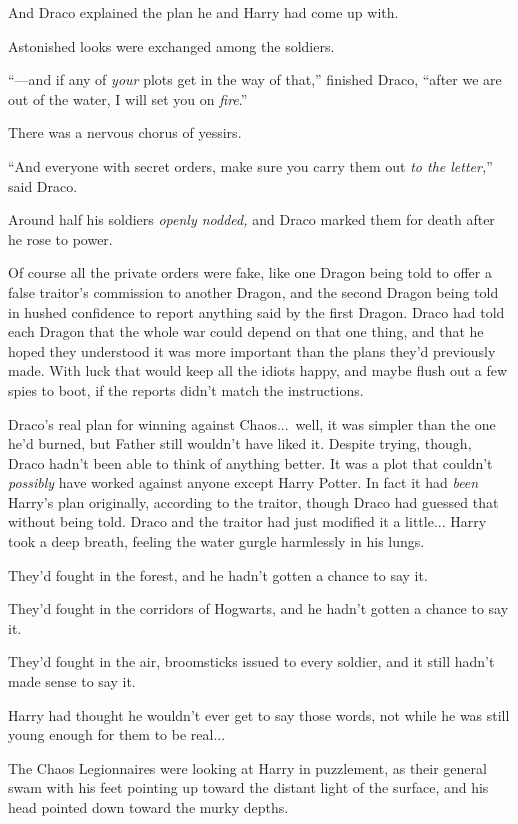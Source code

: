And Draco explained the plan he and Harry had come up with.

Astonished looks were exchanged among the soldiers.

“—and if any of \emph{your} plots get in the way of that,” finished Draco, “after we are out of the water, I will set you on \emph{fire}.”

There was a nervous chorus of yessirs.

“And everyone with secret orders, make sure you carry them out \emph{to the letter,}” said Draco.

Around half his soldiers \emph{openly nodded,} and Draco marked them for death after he rose to power.

Of course all the private orders were fake, like one Dragon being told to offer a false traitor’s commission to another Dragon, and the second Dragon being told in hushed confidence to report anything said by the first Dragon. Draco had told each Dragon that the whole war could depend on that one thing, and that he hoped they understood it was more important than the plans they’d previously made. With luck that would keep all the idiots happy, and maybe flush out a few spies to boot, if the reports didn’t match the instructions.

Draco’s real plan for winning against Chaos...\ well, it was simpler than the one he’d burned, but Father still wouldn’t have liked it. Despite trying, though, Draco hadn’t been able to think of anything better. It was a plot that couldn’t \emph{possibly} have worked against anyone except Harry Potter. In fact it had \emph{been} Harry’s plan originally, according to the traitor, though Draco had guessed that without being told. Draco and the traitor had just modified it a little...
\sbreak
Harry took a deep breath, feeling the water gurgle harmlessly in his lungs.

They’d fought in the forest, and he hadn’t gotten a chance to say it.

They’d fought in the corridors of Hogwarts, and he hadn’t gotten a chance to say it.

They’d fought in the air, broomsticks issued to every soldier, and it still hadn’t made sense to say it.

Harry had thought he wouldn’t ever get to say those words, not while he was still young enough for them to be real...

The Chaos Legionnaires were looking at Harry in puzzlement, as their general swam with his feet pointing up toward the distant light of the surface, and his head pointed down toward the murky depths.

